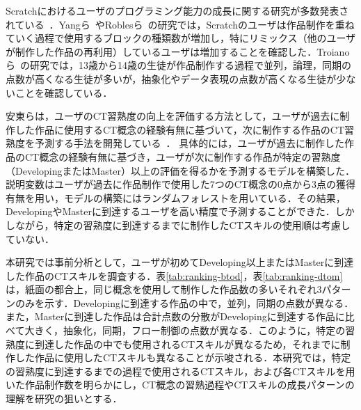 \documentclass[submit]{ipsj}
\begin{document}

Scratchにおけるユーザのプログラミング能力の成長に関する研究が多数発表されている~\cite{Yang_2015}\cite{Troiano_2019}\cite{Ando_2021}\cite{Troiano_2019-2}\cite{ICSE16_Aivalglou}\cite{OEUC10-Kafai}\cite{Troiano_2020}．Yangら~\cite{Yang_2015}やRoblesら~\cite{Robles_2017}の研究では，Scratchのユーザは作品制作を重ねていく過程で使用するブロックの種類数が増加し，特にリミックス（他のユーザが制作した作品の再利用）しているユーザは増加することを確認した．Troianoら~\cite{Troiano_2019}の研究では，13歳から14歳の生徒が作品制作する過程で並列，論理，同期の点数が高くなる生徒が多いが，抽象化やデータ表現の点数が高くなる生徒が少ないことを確認している．

安東らは，ユーザのCT習熟度の向上を評価する方法として，ユーザが過去に制作した作品に使用するCT概念の経験有無に基づいて，次に制作する作品のCT習熟度を予測する手法を開発している~\cite{Ando_2021}．%
具体的には，ユーザが過去に制作した作品のCT概念の経験有無に基づき，ユーザが次に制作する作品が特定の習熟度（DevelopingまたはMaster）以上の評価を得るかを予測するモデルを構築した．説明変数はユーザが過去に作品制作で使用した7つのCT概念の0点から3点の獲得有無を用い，モデルの構築にはランダムフォレストを用いている．その結果，DevelopingやMasterに到達するユーザを高い精度で予測することができた．しかしながら，特定の習熟度に到達するまでに制作したCTスキルの使用順は考慮していない．

本研究では事前分析として，ユーザが初めてDeveloping以上またはMasterに到達した作品のCTスキルを調査する．表\ref{tab:ranking-btod}，表\ref{tab:ranking-dtom}は，紙面の都合上，同じ概念を使用して制作した作品数の多いそれぞれ3パターンのみを示す．Developingに到達する作品の中で，並列，同期の点数が異なる．また，Masterに到達した作品は合計点数の分散がDevelopingに到達する作品に比べて大きく，抽象化，同期，フロー制御の点数が異なる．このように，特定の習熟度に到達した作品の中でも使用されるCTスキルが異なるため，それまでに制作した作品に使用したCTスキルも異なることが示唆される．本研究では，特定の習熟度に到達するまでの過程で使用されるCTスキル，および各CTスキルを用いた作品制作数を明らかにし，CT概念の習熟過程やCTスキルの成長パターンの理解を研究の狙いとする．
\end{document}
